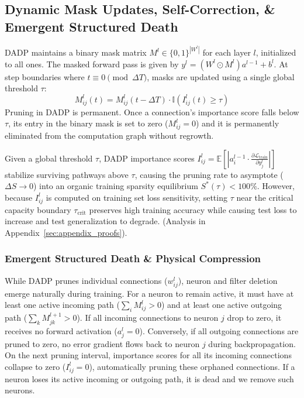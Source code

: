 \subsection{Dynamic Mask Updates, Self-Correction, \& Emergent Structured Death}

DADP maintains a binary mask matrix $M^l \in \{0, 1\}^{|W^l|}$ for each layer $l$, initialized to all ones. The masked forward pass is given by $y^l = (W^l \odot M^l) a^{l-1} + b^l$. At step boundaries where $t \equiv 0 \pmod{\Delta T}$, masks are updated using a single global threshold $\tau$:
\begin{equation}
M_{ij}^l(t) = M_{ij}^l(t - \Delta T) \cdot \mathbb{I}\left( I_{ij}^l(t) \ge \tau \right)
\end{equation}
Pruning in DADP is permanent. Once a connection's importance score falls below $\tau$, its entry in the binary mask is set to zero ($M_{ij}^l = 0$) and it is permanently eliminated from the computation graph without regrowth.

\begin{theorem}
\label{thm:equilibrium}
Given a global threshold $\tau$, DADP importance scores $I_{ij}^l = \mathbb{E}[|a_i^{l-1} \cdot \frac{\partial \mathcal{L}_{\text{train}}}{\partial y_j^l}|]$ stabilize surviving pathways above $\tau$, causing the pruning rate to asymptote ($\Delta S \to 0$) into an organic training sparsity equilibrium $S^*(\tau) < 100\%$. However, because $I_{ij}^l$ is computed on training set loss sensitivity, setting $\tau$ near the critical capacity boundary $\tau_{\text{crit}}$ preserves high training accuracy while causing test loss to increase and test generalization to degrade. (Analysis in Appendix~\ref{sec:appendix_proofs}).
\end{theorem}

\subsubsection{Emergent Structured Death \& Physical Compression}

While DADP prunes individual connections ($w_{ij}^l$), neuron and filter deletion emerge naturally during training. For a neuron to remain active, it must have at least one active incoming path ($\sum_i M_{ij}^l > 0$) and at least one active outgoing path ($\sum_k M_{jk}^{l+1} > 0$). If all incoming connections to neuron $j$ drop to zero, it receives no forward activation ($a_j^l = 0$). Conversely, if all outgoing connections are pruned to zero, no error gradient flows back to neuron $j$ during backpropagation. On the next pruning interval, importance scores for all its incoming connections collapse to zero ($I_{ij}^l = 0$), automatically pruning these orphaned connections. If a neuron loses its active incoming or outgoing path, it is dead and we remove such neurons.

